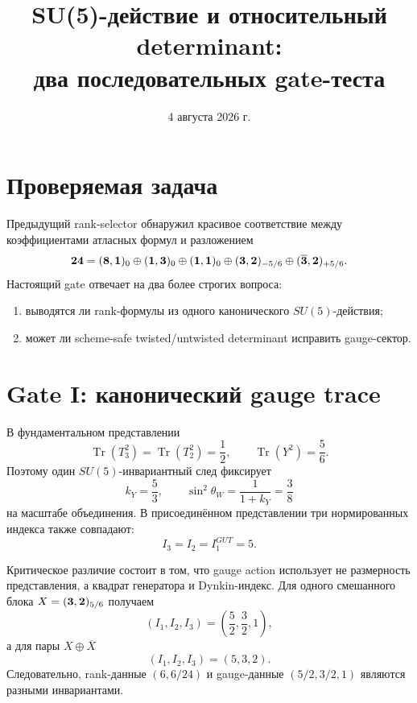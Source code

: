 \documentclass[12pt,a4paper]{article}
\title{SU(5)-действие и относительный determinant:\\
два последовательных gate-теста}
\author{}
\date{4 августа 2026 г.}
\DeclareMathOperator{\Tr}{Tr}
\begin{document}
\maketitle

\section{Проверяемая задача}

Предыдущий rank-selector обнаружил красивое соответствие между коэффициентами
атласных формул и разложением
\begin{equation}
 \mathbf{24}=({\bf8},{\bf1})_0\oplus({\bf1},{\bf3})_0
 \oplus({\bf1},{\bf1})_0\oplus({\bf3},{\bf2})_{-5/6}
 \oplus(\overline{\bf3},{\bf2})_{+5/6}.
\end{equation}
Настоящий gate отвечает на два более строгих вопроса:
\begin{enumerate}
 \item выводятся ли rank-формулы из одного канонического $SU(5)$-действия;
 \item может ли scheme-safe twisted/untwisted determinant исправить gauge-сектор.
\end{enumerate}

\section{Gate I: канонический gauge trace}

В фундаментальном представлении
\begin{equation}
 \Tr(T_3^2)=\Tr(T_2^2)=\frac12,
 \qquad
 \Tr(Y^2)=\frac56.
\end{equation}
Поэтому один $SU(5)$-инвариантный след фиксирует
\begin{equation}
 k_Y=\frac53,
 \qquad
 \sin^2\theta_W=\frac{1}{1+k_Y}=\frac38
\end{equation}
на масштабе объединения. В присоединённом представлении три нормированных
индекса также совпадают:
\begin{equation}
 I_3=I_2=I_1^{GUT}=5.
\end{equation}

Критическое различие состоит в том, что gauge action использует не размерность
представления, а квадрат генератора и Dynkin-индекс. Для одного смешанного
блока $X=({\bf3},{\bf2})_{5/6}$ получаем
\begin{equation}
 (I_1,I_2,I_3)=\left(\frac52,\frac32,1\right),
\end{equation}
а для пары $X\oplus\overline X$
\begin{equation}
 (I_1,I_2,I_3)=(5,3,2).
\end{equation}
Следовательно, rank-данные $(6,6/24)$ и gauge-данные $(5/2,3/2,1)$ являются
разными инвариантами.
\end{document}
